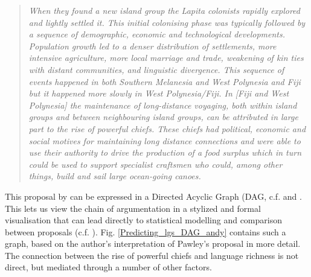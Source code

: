\documentclass[12pt,letterpaper]{article}
\begin{document}
\begin{quotation}
\noindent \emph{When they found a new island group the Lapita colonists rapidly explored and lightly settled it. This initial colonising phase was typically followed by a sequence of demographic, economic and technological developments. Population growth led to a denser distribution of settlements, more intensive agriculture, more local marriage and trade, weakening of kin ties with distant communities, and linguistic divergence. This sequence of events happened in both Southern Melanesia and West Polynesia and Fiji but it happened more slowly in West Polynesia/Fiji. In [Fiji and West Polynesia] the maintenance of long-distance voyaging, both within island groups and between neighbouring island groups, can be attributed in large part to the rise of powerful chiefs. These chiefs had political, economic and social motives for maintaining long distance connections and were able to use their authority to drive the production of a food surplus which in turn could be used to support specialist craftsmen who could, among other things, build and sail large ocean-going canoes.} \citep[28]{pawley2007} \end{quotation}

This proposal by \citet{pawley81, pawley2007} can be expressed in a Directed Acyclic Graph (DAG, c.f. \citet{pearl1995causal} and \citet{mcelreath2020statistical}. This lets us view the chain of argumentation in a stylized and formal visualisation that can lead directly to statistical modelling and comparison between proposals (c.f. \citet{roberts2020chield}). Fig. \ref{Predicting_lgs_DAG_andy} contains such a graph, based on the author's interpretation of Pawley's proposal in more detail. The connection between the rise of powerful chiefs and language richness is not direct, but mediated through a number of other factors. 
\end{document}
